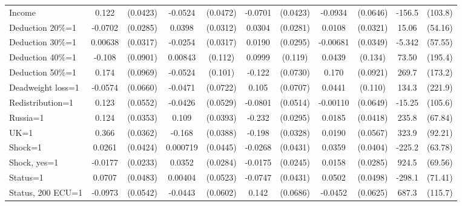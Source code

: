 \begin{tabular}{l|cccccc|cc|cc}
Income          &    0.122\sym{***}& (0.0423)&  -0.0524         & (0.0472)&  -0.0701\sym{*}  & (0.0423)&  -0.0934         & (0.0646)&   -156.5         &  (103.8)\\
Deduction 20\%=1&  -0.0702\sym{**} & (0.0285)&   0.0398         & (0.0312)&   0.0304         & (0.0281)&   0.0108         & (0.0321)&    15.06         &  (54.16)\\
Deduction 30\%=1&  0.00638         & (0.0317)&  -0.0254         & (0.0317)&   0.0190         & (0.0295)& -0.00681         & (0.0349)&   -5.342         &  (57.55)\\
Deduction 40\%=1&   -0.108         & (0.0901)&  0.00843         &  (0.112)&   0.0999         &  (0.119)&   0.0439         &  (0.134)&    73.50         &  (195.4)\\
Deduction 50\%=1&    0.174\sym{*}  & (0.0969)&  -0.0524         &  (0.101)&   -0.122\sym{*}  & (0.0730)&    0.170\sym{*}  & (0.0921)&    269.7         &  (173.2)\\
Deadweight loss=1&  -0.0574         & (0.0660)&  -0.0471         & (0.0722)&    0.105         & (0.0707)&   0.0441         &  (0.110)&    134.3         &  (221.9)\\
Redistribution=1&    0.123\sym{**} & (0.0552)&  -0.0426         & (0.0529)&  -0.0801         & (0.0514)& -0.00110         & (0.0649)&   -15.25         &  (105.6)\\
Russia=1        &    0.124\sym{***}& (0.0353)&    0.109\sym{***}& (0.0393)&   -0.232\sym{***}& (0.0295)&   0.0185         & (0.0418)&    235.8\sym{***}&  (67.84)\\
UK=1            &    0.366\sym{***}& (0.0362)&   -0.168\sym{***}& (0.0388)&   -0.198\sym{***}& (0.0328)&   0.0190         & (0.0567)&    323.9\sym{***}&  (92.21)\\
Shock=1         &   0.0261         & (0.0424)& 0.000719         & (0.0445)&  -0.0268         & (0.0431)&   0.0359         & (0.0404)&   -225.2\sym{***}&  (63.78)\\
Shock, yes=1    &  -0.0177         & (0.0233)&   0.0352         & (0.0284)&  -0.0175         & (0.0245)&   0.0158         & (0.0285)&    924.5\sym{***}&  (69.56)\\
Status=1        &   0.0707         & (0.0483)&  0.00404         & (0.0523)&  -0.0747\sym{*}  & (0.0431)&   0.0502         & (0.0498)&   -298.1\sym{***}&  (71.41)\\
Status, 200 ECU=1&  -0.0973\sym{*}  & (0.0542)&  -0.0443         & (0.0602)&    0.142\sym{**} & (0.0686)&  -0.0452         & (0.0625)&    687.3\sym{***}&  (115.7)\\

\end{tabular}
